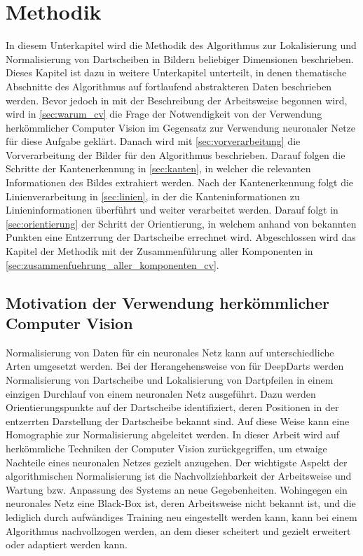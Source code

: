 
\section{Methodik}
\label{sec:cv:methodik}

In diesem Unterkapitel wird die Methodik des Algorithmus zur Lokalisierung und Normalisierung von Dartscheiben in Bildern beliebiger Dimensionen beschrieben. Dieses Kapitel ist dazu in weitere Unterkapitel unterteilt, in denen thematische Abschnitte des Algorithmus auf fortlaufend abstrakteren Daten beschrieben werden. Bevor jedoch in mit der Beschreibung der Arbeitsweise begonnen wird, wird in \autoref{sec:warum_cv} die Frage der Notwendigkeit von der Verwendung herkömmlicher Computer Vision im Gegensatz zur Verwendung neuronaler Netze für diese Aufgabe geklärt. Danach wird mit \autoref{sec:vorverarbeitung} die Vorverarbeitung der Bilder für den Algorithmus beschrieben. Darauf folgen die Schritte der Kantenerkennung in \autoref{sec:kanten}, in welcher die relevanten Informationen des Bildes extrahiert werden. Nach der Kantenerkennung folgt die Linienverarbeitung in \autoref{sec:linien}, in der die Kanteninformationen zu Linieninformationen überführt und weiter verarbeitet werden. Darauf folgt in \autoref{sec:orientierung} der Schritt der Orientierung, in welchem anhand von bekannten Punkten eine Entzerrung der Dartscheibe errechnet wird. Abgeschlossen wird das Kapitel der Methodik mit der Zusammenführung aller Komponenten in \autoref{sec:zusammenfuehrung_aller_komponenten_cv}.


\subsection{Motivation der Verwendung herkömmlicher Computer Vision}
\label{sec:warum_cv}

Normalisierung von Daten für ein neuronales Netz kann auf unterschiedliche Arten umgesetzt werden. Bei der Herangehensweise von \citeauthor{deepdarts} für DeepDarts werden Normalisierung von Dartscheibe und Lokalisierung von Dartpfeilen in einem einzigen Durchlauf von einem neuronalen Netz ausgeführt. Dazu werden Orientierungspunkte auf der Dartscheibe identifiziert, deren Positionen in der entzerrten Darstellung der Dartscheibe bekannt sind. Auf diese Weise kann eine Homographie zur Normalisierung abgeleitet werden. In dieser Arbeit wird auf herkömmliche Techniken der Computer Vision zurückgegriffen, um etwaige Nachteile eines neuronalen Netzes gezielt anzugehen. Der wichtigste Aspekt der algorithmischen Normalisierung ist die Nachvollziehbarkeit der Arbeitsweise und Wartung bzw. Anpassung des Systems an neue Gegebenheiten. Wohingegen ein neuronales Netz eine Black-Box ist, deren Arbeitsweise nicht bekannt ist, und die lediglich durch aufwändiges Training neu eingestellt werden kann, kann bei einem Algorithmus nachvollzogen werden, an dem dieser scheitert und gezielt erweitert oder adaptiert werden kann.

